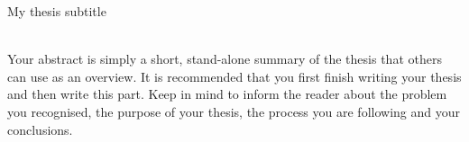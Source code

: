 \begin{center}
    \Large
    \vspace{0.4cm}
    \large
    My thesis subtitle
    
    \vspace{0.4cm}
    \vspace{1.5cm}
\\
\vspace{25mm}
Your abstract is simply a short, stand-alone summary of the thesis that others can use as an overview. It is recommended that you first finish writing your thesis and then write this part. Keep in mind to inform the reader about the problem you recognised, the purpose of your thesis, the process you are following and your conclusions.
\end{center}